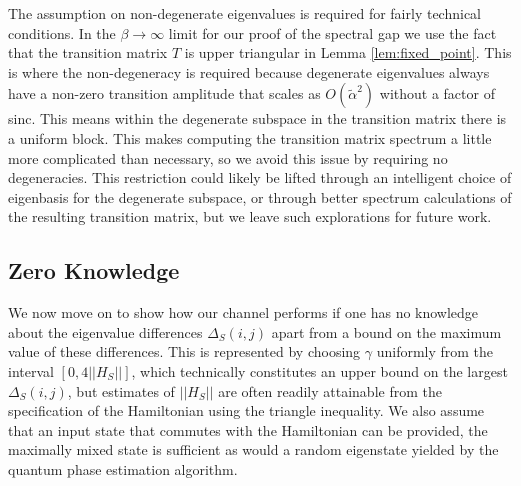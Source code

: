 \documentclass[
 amsmath,amssymb,
 aps,
onecolumn, 
nofootinbib]{revtex4-2}
\newcommand{\norm}[1]{\left|\left| #1 \right|\right|}
\newcommand{\bigo}[1]{O\left(#1\right)}
\begin{document}
The assumption on non-degenerate eigenvalues is required for fairly technical conditions. In the $\beta \to \infty$ limit for our proof of the spectral gap we use the fact that the transition matrix $T$ is upper triangular in Lemma \ref{lem:fixed_point}. This is where the non-degeneracy is required because degenerate eigenvalues always have a non-zero transition amplitude that scales as $\bigo{\widetilde{\alpha}^2}$ without a factor of sinc. This means within the degenerate subspace in the transition matrix there is a uniform block. This makes computing the transition matrix spectrum a little more complicated than necessary, so we avoid this issue by requiring no degeneracies. This restriction could likely be lifted through an intelligent choice of eigenbasis for the degenerate subspace, or through better spectrum calculations of the resulting transition matrix, but we leave such explorations for future work. 



\subsection{Zero Knowledge} \label{sec:zero_knowledge}
We now move on to show how our channel performs if one has no knowledge about the eigenvalue differences $\Delta_S(i,j)$ apart from a bound on the maximum value of these differences. This is represented by choosing $\gamma$ uniformly from the interval $[0, 4 \norm{H_S}]$, which technically constitutes an upper bound on the largest $\Delta_S(i,j)$, but estimates of $\norm{H_S}$ are often readily attainable from the specification of the Hamiltonian using the triangle inequality.  We also assume that an input state that commutes with the Hamiltonian can be provided, the maximally mixed state is sufficient as would a random eigenstate yielded by the quantum phase estimation algorithm.
\end{document}

